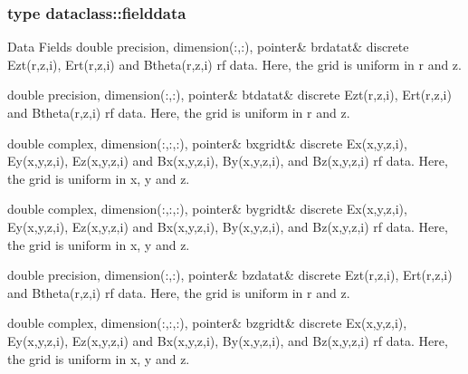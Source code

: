 \subsubsection{type dataclass\+::fielddata}
\begin{DoxyFields}{Data Fields}
\mbox{\label{namespacedataclass_af2e812c6f2b2202954a724f0c7f934ca}} 
double precision, dimension(:,:), pointer&
brdatat&
discrete Ezt(r,z,i), Ert(r,z,i) and Btheta(r,z,i) rf data. Here, the grid is uniform in r and z. \\
\hline

\mbox{\label{namespacedataclass_a36e12caa5512ea4a766181f407257c1e}} 
double precision, dimension(:,:), pointer&
btdatat&
discrete Ezt(r,z,i), Ert(r,z,i) and Btheta(r,z,i) rf data. Here, the grid is uniform in r and z. \\
\hline

\mbox{\label{namespacedataclass_a721338251ef870b206bd747d77330be2}} 
double complex, dimension(:,:,:), pointer&
bxgridt&
discrete Ex(x,y,z,i), Ey(x,y,z,i), Ez(x,y,z,i) and Bx(x,y,z,i), By(x,y,z,i), and Bz(x,y,z,i) rf data. Here, the grid is uniform in x, y and z. \\
\hline

\mbox{\label{namespacedataclass_a5be2ee97690040bc191e474a8128268c}} 
double complex, dimension(:,:,:), pointer&
bygridt&
discrete Ex(x,y,z,i), Ey(x,y,z,i), Ez(x,y,z,i) and Bx(x,y,z,i), By(x,y,z,i), and Bz(x,y,z,i) rf data. Here, the grid is uniform in x, y and z. \\
\hline

\mbox{\label{namespacedataclass_aeff2d035d7e3b4ee7bb7efea43b160fe}} 
double precision, dimension(:,:), pointer&
bzdatat&
discrete Ezt(r,z,i), Ert(r,z,i) and Btheta(r,z,i) rf data. Here, the grid is uniform in r and z. \\
\hline

\mbox{\label{namespacedataclass_a9624d17177a345e1bc8749b6bdb4c451}} 
double complex, dimension(:,:,:), pointer&
bzgridt&
discrete Ex(x,y,z,i), Ey(x,y,z,i), Ez(x,y,z,i) and Bx(x,y,z,i), By(x,y,z,i), and Bz(x,y,z,i) rf data. Here, the grid is uniform in x, y and z. \\
\hline


\end{DoxyFields}
